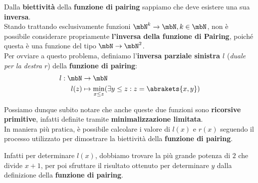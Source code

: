 Dalla \textbf{biettività} della \textbf{funzione di pairing} sappiamo che deve esistere una sua \textbf{inversa}.\\
Stando trattando esclusivamente funzioni \(\mbN^k\rightarrow\mbN, k \in \mbN\), non è possibile considerare propriamente \textbf{l'inversa della funzione di Pairing}, poiché questa è una funzione del tipo \(\mbN\rightarrow\mbN^2\).\\
Per ovviare a questo problema, definiamo l'\textbf{inversa parziale sinistra \(l\)} (\textit{duale per la destra \(r\)}) della \textbf{funzione di pairing}:
\begin{equation}
  \begin{split}
    l:\mbN&\rightarrow\mbN\\
    l(z) &\mapsto \min_{x\leq z}(\exists y \leq z: z= \abrakets{ x,y })\\
  \end{split}
\end{equation}

Possiamo dunque subito notare che anche queste due funzioni sono \textbf{ricorsive primitive}, infatti definite tramite \textbf{minimalizzazione limitata}.\\
In maniera più pratica, è possibile  calcolare i valore di \(l(x)\) e \(r(x)\) seguendo il processo utilizzato per dimostrare la biettività della \textbf{funzione di pairing}.

Infatti per determinare \(l(x)\), dobbiamo trovare la più grande potenza di \(2\) che divide \(x+1\), per poi sfruttare il risultato ottenuto per determinare \(y\) dalla definizione della \textbf{funzione di pairing}.
\newpage

